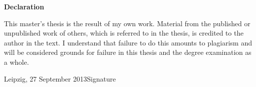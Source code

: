 \documentclass[%
  parskip=half,
  ]{scrreprt} %
\begin{document}
\listoffigures
\listoftables

\clearpage
\pagestyle{empty}
\vspace*{1cm}
\begin{center}
\textbf{\sffamily Declaration}
\end{center}
\vspace*{0.5cm}
This master's thesis is the result of my own work. Material from the published or unpublished work of others, which is referred to in the thesis, is credited to the author in the text. I understand that failure to do this amounts to plagiarism and will be considered grounds for failure in this thesis and the degree examination as a whole.

\vspace{2cm}
\noindent
Leipzig, 27 September 2013\hfill Signature
\end{document}
